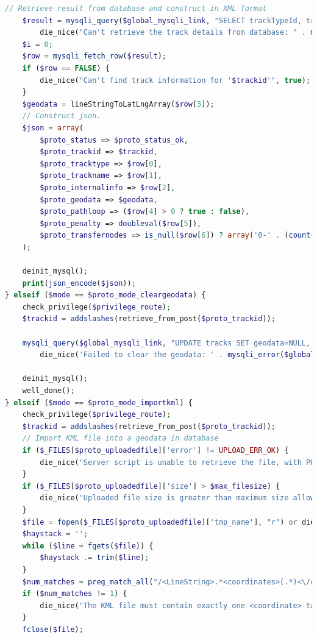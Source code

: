 \documentclass[a4paper,twoside]{article}
\begin{document}
\begin{enumerate}
\begin{lstlisting}[language=PHP,basicstyle=\tiny,caption=handle.php,label={lst:handle.php}]
	// Retrieve result from database and construct in XML format
	$result = mysqli_query($global_mysqli_link, "SELECT trackTypeId, trackName, internalInfo, AsText(geodata), pathloop, penalty, transferNodes FROM tracks WHERE trackId='$trackid'") or
		die_nice("Can't retrieve the track details from database: " . mysqli_error($global_mysqli_link), true);
	$i = 0;
	$row = mysqli_fetch_row($result);
	if ($row == FALSE) {
		die_nice("Can't find track information for '$trackid'", true);
	}
	$geodata = lineStringToLatLngArray($row[3]);
	// Construct json.
	$json = array(
		$proto_status => $proto_status_ok,
		$proto_trackid => $trackid,
		$proto_tracktype => $row[0],
		$proto_trackname => $row[1],
		$proto_internalinfo => $row[2],
		$proto_geodata => $geodata,
		$proto_pathloop => ($row[4] > 0 ? true : false),
		$proto_penalty => doubleval($row[5]),
		$proto_transfernodes => is_null($row[6]) ? array('0-' . (count($geodata) - 1)) : split(',', $row[6]), 
	);
	
	deinit_mysql();
	print(json_encode($json));
} elseif ($mode == $proto_mode_cleargeodata) {
	check_privilege($privilege_route);
	$trackid = addslashes(retrieve_from_post($proto_trackid));
	
	mysqli_query($global_mysqli_link, "UPDATE tracks SET geodata=NULL, transferNodes=NULL WHERE trackId='$trackid'") or
		die_nice('Failed to clear the geodata: ' . mysqli_error($global_mysqli_link), true);
	
	deinit_mysql();
	well_done();
} elseif ($mode == $proto_mode_importkml) {
	check_privilege($privilege_route);
	$trackid = addslashes(retrieve_from_post($proto_trackid));
	// Import KML file into a geodata in database
	if ($_FILES[$proto_uploadedfile]['error'] != UPLOAD_ERR_OK) {
		die_nice("Server script is unable to retrieve the file, with PHP's UPLOAD_ERR_xxx code: " . $_FILES[$proto_uploadedfile]['error'], true);
	}
	if ($_FILES[$proto_uploadedfile]['size'] > $max_filesize) {
		die_nice("Uploaded file size is greater than maximum size allowed ($max_filesize)", true);
	}
	$file = fopen($_FILES[$proto_uploadedfile]['tmp_name'], "r") or die_nice('Unable to open uploaded file', true);
	$haystack = '';
	while ($line = fgets($file)) {
		$haystack .= trim($line);
	}
	$num_matches = preg_match_all("/<LineString>.*<coordinates>(.*)<\/coordinates>.*<\/LineString>/i", $haystack, $matches, PREG_PATTERN_ORDER);
	if ($num_matches != 1) {
		die_nice("The KML file must contain exactly one <coordinate> tag inside one <LineString> tag. But I found $num_matches occurences", true);
	}
	fclose($file);
	

\end{lstlisting}
\end{enumerate}
\end{document}

